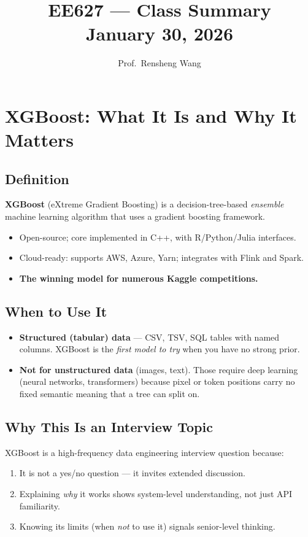 \documentclass[11pt]{article}
\title{\textbf{EE627 --- Class Summary}\\[0.4em]
       \large January 30, 2026}
\author{Prof.\ Rensheng Wang}
\date{}
\begin{document}
\maketitle
\tableofcontents
\newpage

\section{XGBoost: What It Is and Why It Matters}

\subsection{Definition}
\textbf{XGBoost} (eXtreme Gradient Boosting) is a decision-tree-based \emph{ensemble} machine
learning algorithm that uses a gradient boosting framework.

\begin{itemize}
    \item Open-source; core implemented in C++, with R/Python/Julia interfaces.
    \item Cloud-ready: supports AWS, Azure, Yarn; integrates with Flink and Spark.
    \item \textbf{The winning model for numerous Kaggle competitions.}
\end{itemize}

\subsection{When to Use It}
\begin{itemize}
    \item \textbf{Structured (tabular) data} --- CSV, TSV, SQL tables with named columns.
      XGBoost is the \emph{first model to try} when you have no strong prior.
    \item \textbf{Not for unstructured data} (images, text). Those require deep learning
      (neural networks, transformers) because pixel or token positions carry no fixed
      semantic meaning that a tree can split on.
\end{itemize}

\subsection{Why This Is an Interview Topic}
XGBoost is a high-frequency data engineering interview question because:
\begin{enumerate}
    \item It is not a yes/no question --- it invites extended discussion.
    \item Explaining \emph{why} it works shows system-level understanding, not just API familiarity.
    \item Knowing its limits (when \emph{not} to use it) signals senior-level thinking.
\end{enumerate}
\end{document}
